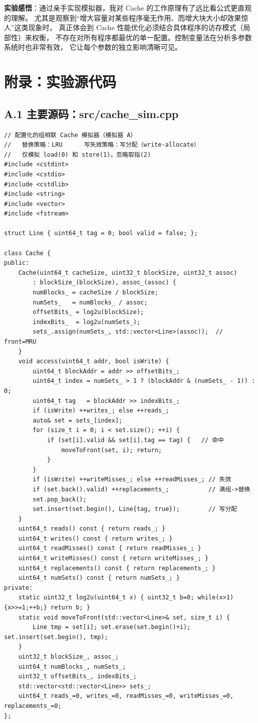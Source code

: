 \documentclass[12pt,a4paper]{ctexart}
\begin{document}
\textbf{实验感悟}：通过亲手实现模拟器，我对 Cache 的工作原理有了远比看公式更直观的理解。
尤其是观察到“增大容量对某些程序毫无作用、而增大块大小却效果惊人”这类现象时，
真正体会到 Cache 性能优化必须结合具体程序的访存模式（局部性）来权衡，
不存在对所有程序都最优的单一配置。控制变量法在分析多参数系统时也非常有效，
它让每个参数的独立影响清晰可见。

\section*{附录：实验源代码}
\subsection*{A.1 主要源码：src/cache\_sim.cpp}
\begin{lstlisting}
// 配置化的组相联 Cache 模拟器（模拟器 A）
//   替换策略：LRU      写失效策略：写分配（write-allocate）
//   仅模拟 load(0) 和 store(1)，忽略取指(2)
#include <cstdint>
#include <cstdio>
#include <cstdlib>
#include <string>
#include <vector>
#include <fstream>

struct Line { uint64_t tag = 0; bool valid = false; };

class Cache {
public:
    Cache(uint64_t cacheSize, uint32_t blockSize, uint32_t assoc)
        : blockSize_(blockSize), assoc_(assoc) {
        numBlocks_ = cacheSize / blockSize;
        numSets_   = numBlocks_ / assoc;
        offsetBits_ = log2u(blockSize);
        indexBits_  = log2u(numSets_);
        sets_.assign(numSets_, std::vector<Line>(assoc));  // front=MRU
    }
    void access(uint64_t addr, bool isWrite) {
        uint64_t blockAddr = addr >> offsetBits_;
        uint64_t index = numSets_ > 1 ? (blockAddr & (numSets_ - 1)) : 0;
        uint64_t tag   = blockAddr >> indexBits_;
        if (isWrite) ++writes_; else ++reads_;
        auto& set = sets_[index];
        for (size_t i = 0; i < set.size(); ++i) {
            if (set[i].valid && set[i].tag == tag) {   // 命中
                moveToFront(set, i); return;
            }
        }
        if (isWrite) ++writeMisses_; else ++readMisses_; // 失效
        if (set.back().valid) ++replacements_;           // 满组->替换
        set.pop_back();
        set.insert(set.begin(), Line{tag, true});        // 写分配
    }
    uint64_t reads() const { return reads_; }
    uint64_t writes() const { return writes_; }
    uint64_t readMisses() const { return readMisses_; }
    uint64_t writeMisses() const { return writeMisses_; }
    uint64_t replacements() const { return replacements_; }
    uint64_t numSets() const { return numSets_; }
private:
    static uint32_t log2u(uint64_t x) { uint32_t b=0; while(x>1){x>>=1;++b;} return b; }
    static void moveToFront(std::vector<Line>& set, size_t i) {
        Line tmp = set[i]; set.erase(set.begin()+i); set.insert(set.begin(), tmp);
    }
    uint32_t blockSize_, assoc_;
    uint64_t numBlocks_, numSets_;
    uint32_t offsetBits_, indexBits_;
    std::vector<std::vector<Line>> sets_;
    uint64_t reads_=0, writes_=0, readMisses_=0, writeMisses_=0, replacements_=0;
};


\end{lstlisting}
\end{document}
